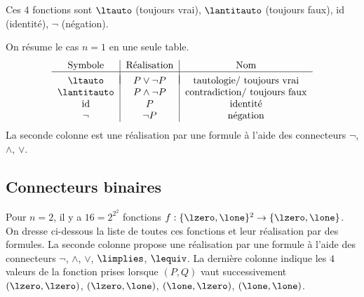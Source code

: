 \documentclass[11pt,class=report,crop=false]{standalone}
\begin{document}
Ces $4$ fonctions sont $\ltauto$ (toujours vrai), $\lantitauto$ (toujours faux), $\mathrm{id}$ (identité), $\lnot$ (négation).

On résume le cas $n=1$ en une seule table.
\[
\begin{tabular}{c|c|c}
	Symbole & Réalisation & Nom \\
	\hline
	& \\[-2ex]
	$\ltauto$ 		& $P \lor \lnot P$ 	& tautologie/ toujours vrai \\
	$\lantitauto$  	& $P \land \lnot P$ 	& contradiction/ toujours faux \\
	$\mathrm{id}$ 		& $P$  		& identité \\
	$\lnot$  	& $\lnot P$   		& négation \\	
\end{tabular}
\]
La seconde colonne est une réalisation par une formule à l'aide des connecteurs $\lnot$, $\land$, $\lor$.



\subsection{Connecteurs binaires}

Pour $n=2$, il y a $16 = 2^{2^2}$ fonctions $f : \{\lzero,\lone\}^2 \to \{\lzero,\lone\}$.
On dresse ci-dessous la liste de toutes ces fonctions et leur réalisation par des formules.
La seconde colonne propose une réalisation par une formule à l'aide des connecteurs $\lnot$, $\land$, $\lor$, $\limplies$, $\lequiv$.
La dernière colonne indique les $4$ valeurs de la fonction prises lorsque $(P,Q)$ vaut successivement $(\lzero,\lzero)$, $(\lzero,\lone)$, $(\lone,\lzero)$, $(\lone,\lone)$.
\end{document}
